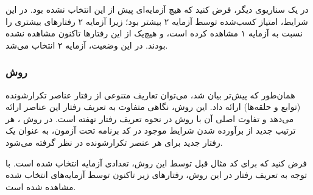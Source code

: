 در یک سناریوی دیگر، فرض کنید که هیچ آزمایه‌ای پیش از این انتخاب نشده بود. در این شرایط، امتیاز کسب‌شده توسط آزمایه ۲ بیشتر بود؛ زیرا آزمایه ۲ رفتارهای بیشتری را نسبت به آزمایه ۱ مشاهده کرده است، و هیچ‌یک از این رفتارها تاکنون مشاهده نشده بودند. در این وضعیت، آزمایه ۲ انتخاب می‌شد.


\subsubsection{روش }
همان‌طور که پیش‌تر بیان شد، می‌توان تعاریف متنوعی از رفتار عناصر تکرارشونده (توابع و حلقه‌ها) ارائه داد. این روش، نگاهی متفاوت به تعریف رفتار این عناصر ارائه می‌دهد و تفاوت اصلی آن با روش  در نحوه تعریف رفتار نهفته است. در روش ، هر ترتیب جدید از برآورده شدن شرایط موجود در کد برنامه تحت آزمون، به عنوان یک رفتار جدید برای هر عنصر تکرارشونده در نظر گرفته می‌شود.


فرض کنید که برای کد مثال قبل توسط این روش، تعدادی آزمایه انتخاب شده است. با توجه به تعریف رفتار در این روش، رفتارهای زیر تاکنون توسط آزمایه‌های انتخاب شده مشاهده شده است.

